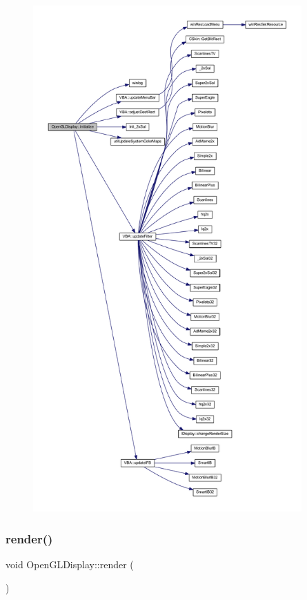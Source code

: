 \begin{figure}[H]
\begin{center}
\leavevmode
\includegraphics[height=550pt]{class_open_g_l_display_af0db619c7083f43e9bc61f1705843b53_cgraph}
\end{center}
\end{figure}
\mbox{\label{class_open_g_l_display_aa0ae6cc7e0a15da37e167d6f91590c49}} 
\subsubsection{\texorpdfstring{render()}{render()}}
{\footnotesize\ttfamily void Open\+G\+L\+Display\+::render (\begin{DoxyParamCaption}{ }\end{DoxyParamCaption})\hspace{0.3cm}{\ttfamily [virtual]}}



